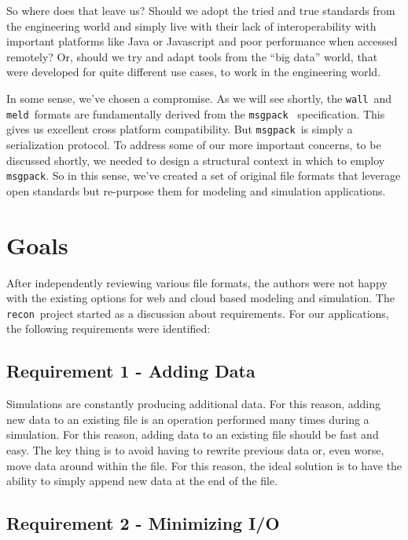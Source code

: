 \documentclass[11pt,a4paper,onecolumn]{article}
\newcommand{\recon}{\texttt{recon}}
\newcommand{\wall}{\texttt{wall}}
\newcommand{\meld}{\texttt{meld}}
\newcommand{\msgpack}{\texttt{msgpack}}
\begin{document}
So where does that leave us?  Should we adopt the tried and true
standards from the engineering world and simply live with their lack
of interoperability with important platforms like Java or Javascript
and poor performance when accessed remotely?  Or, should we try and
adapt tools from the ``big data'' world, that were developed for quite
different use cases, to work in the engineering world.

In some sense, we've chosen a compromise.  As we will see shortly, the
\wall\ and \meld\ formats are fundamentally derived from the
\msgpack\ \cite{msgpack} specification.  This gives us excellent cross
platform compatibility.  But \msgpack\  is simply a serialization
protocol.  To address some of our more important concerns, to be
discussed shortly, we needed to design a structural context in which
to employ \msgpack. So in this sense, we've created a set of original
file formats that leverage open standards but re-purpose them for
modeling and simulation applications.

\section{Goals}
\label{sec:goals}

After independently reviewing various file formats, the authors were
not happy with the existing options for web and cloud based modeling
and simulation.  The \recon\ project started as a discussion about
requirements.  For our applications, the following requirements were
identified:

\subsection{Requirement 1 - Adding Data}


Simulations are constantly producing additional data.  For this
reason, adding new data to an existing file is an operation performed
many times during a simulation.  For this reason, adding data to an
existing file should be fast and easy.  The key thing is to avoid having to
rewrite previous data or, even worse, move data around within the
file.  For this reason, the ideal solution is to have the ability to
simply append new data at the end of the file.

\subsection{Requirement 2 - Minimizing I/O}
\end{document}
